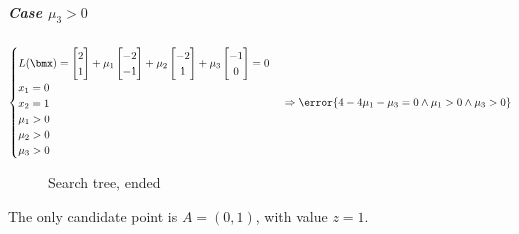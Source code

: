 \documentclass[\main/main.tex]{subfiles}
\begin{document}
\subparagraph*{Case $\mu_3>0$}
\[
  \begin{cases}
    L(\bmx) = \begin{bmatrix}
      2 \\
      1
    \end{bmatrix} + \mu_1 \begin{bmatrix}
      -2 \\
      -1
    \end{bmatrix} + \mu_2 \begin{bmatrix}
      -2 \\
      1
    \end{bmatrix} + \mu_3 \begin{bmatrix}
      -1 \\
      0
    \end{bmatrix} = 0 \\
    x_1                           = 0                                                                                                                 \\
    x_2                           = 1                                                                                                                 \\
    \mu_1 > 0                                                                                                                                         \\
    \mu_2 > 0                                                                                                                                         \\
    \mu_3 > 0
  \end{cases}
  \Rightarrow
  \error{4 - 4\mu_1 - \mu_3 = 0 \land \mu_1 > 0 \land \mu_3 > 0}
\]
\begin{figure}
  \caption{Search tree, ended}
\end{figure}

The only candidate point is $A=(0,1)$, with value $z=1$.
\end{document}
